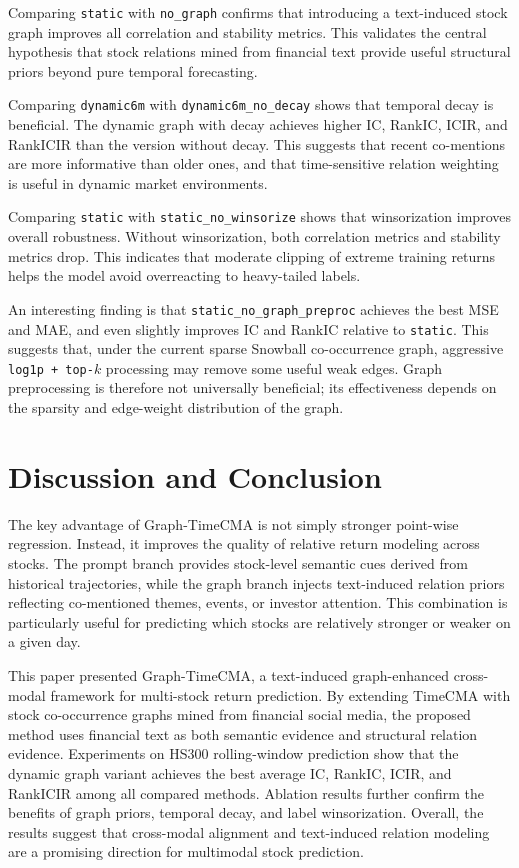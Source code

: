 \documentclass[runningheads]{llncs}
\begin{document}
Comparing \texttt{static} with \texttt{no\_graph} confirms that introducing a text-induced stock graph improves all correlation and stability metrics. This validates the central hypothesis that stock relations mined from financial text provide useful structural priors beyond pure temporal forecasting.

Comparing \texttt{dynamic6m} with \texttt{dynamic6m\_no\_decay} shows that temporal decay is beneficial. The dynamic graph with decay achieves higher IC, RankIC, ICIR, and RankICIR than the version without decay. This suggests that recent co-mentions are more informative than older ones, and that time-sensitive relation weighting is useful in dynamic market environments.

Comparing \texttt{static} with \texttt{static\_no\_winsorize} shows that winsorization improves overall robustness. Without winsorization, both correlation metrics and stability metrics drop. This indicates that moderate clipping of extreme training returns helps the model avoid overreacting to heavy-tailed labels.

An interesting finding is that \texttt{static\_no\_graph\_preproc} achieves the best MSE and MAE, and even slightly improves IC and RankIC relative to \texttt{static}. This suggests that, under the current sparse Snowball co-occurrence graph, aggressive \texttt{log1p + top-$k$} processing may remove some useful weak edges. Graph preprocessing is therefore not universally beneficial; its effectiveness depends on the sparsity and edge-weight distribution of the graph.

\section{Discussion and Conclusion}

The key advantage of Graph-TimeCMA is not simply stronger point-wise regression. Instead, it improves the quality of relative return modeling across stocks. The prompt branch provides stock-level semantic cues derived from historical trajectories, while the graph branch injects text-induced relation priors reflecting co-mentioned themes, events, or investor attention. This combination is particularly useful for predicting which stocks are relatively stronger or weaker on a given day.

This paper presented Graph-TimeCMA, a text-induced graph-enhanced cross-modal framework for multi-stock return prediction. By extending TimeCMA with stock co-occurrence graphs mined from financial social media, the proposed method uses financial text as both semantic evidence and structural relation evidence. Experiments on HS300 rolling-window prediction show that the dynamic graph variant achieves the best average IC, RankIC, ICIR, and RankICIR among all compared methods. Ablation results further confirm the benefits of graph priors, temporal decay, and label winsorization. Overall, the results suggest that cross-modal alignment and text-induced relation modeling are a promising direction for multimodal stock prediction.



\end{document}
